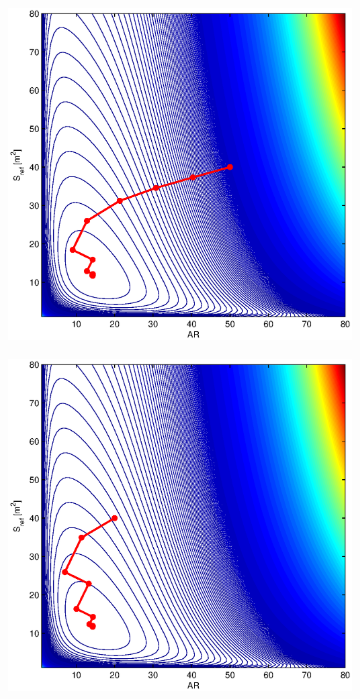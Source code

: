 \documentclass[12pt,parskip=full]{article}
\numberwithin{subsection}{section}
\begin{document}
		\begin{figure}[!ht]
			\centering
			\begin{subfigure}[h]{0.3\textwidth}
				\includegraphics[width=\textwidth]{SteepestDrag1.eps}
			\end{subfigure}
			\begin{subfigure}[h]{0.3\textwidth}
				\includegraphics[width=\textwidth]{SteepestDrag2.eps}

\end{subfigure}
\end{figure}
\end{document}
